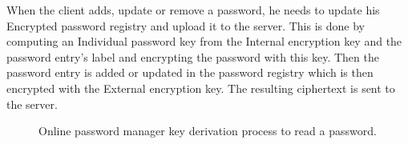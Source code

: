 \documentclass[../report.tex]{subfiles}
\begin{document}
When the client adds, update or remove a password, he needs to update his Encrypted password registry and upload it to the server. This is done by computing an Individual password key from the Internal encryption key and the password entry's label and encrypting the password with this key. Then the password entry is added or updated in the password registry which is then encrypted with the External encryption key. The resulting ciphertext is sent to the server.

\begin{figure}[h]
 \centering
 \setlength{\fboxsep}{10pt}
 \setlength{\fboxrule}{1pt}
 \caption{Online password manager key derivation process to read a password.}
 \label{fig:Online_password_manager}
\end{figure}
\end{document}

